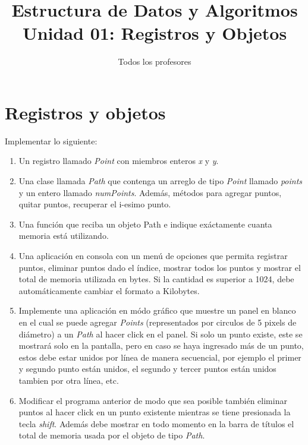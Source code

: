 \documentclass[a4paper]{article}
\title{Estructura de Datos y Algoritmos \\
  \large Unidad 01: Registros y Objetos}
\author{Todos los profesores}
\begin{document}
\maketitle

\section{Registros y objetos}
Implementar lo siguiente:
\begin{enumerate}
  \item Un registro llamado \emph{Point} con miembros enteros \emph{x} y
    \emph{y}.
  \item Una clase llamada \emph{Path} que contenga un arreglo de tipo
    \emph{Point} llamado \emph{points} y un entero llamado \emph{numPoints}.
    Además, métodos para agregar puntos, quitar puntos, recuperar el i-esimo
    punto.
  \item Una función que reciba un objeto Path e indique exáctamente cuanta
    memoria está utilizando.
  \item Una aplicación en consola con un menú de opciones que permita registrar
    puntos, eliminar puntos dado el índice, mostrar todos los puntos y mostrar
    el total de memoria utilizada en bytes. Si la cantidad es superior a 1024,
    debe automáticamente cambiar el formato a Kilobytes.
  \item Implemente una aplicación en módo gráfico que muestre un panel en blanco
    en el cual se puede agregar \emph{Points} (representados por circulos de 5
    pixels de diámetro) a un \emph{Path} al hacer click en el panel. Si solo un
    punto existe, este se mostrará solo en la pantalla, pero en caso se haya
    ingresado más de un punto, estos debe estar unidos por línea de manera
    secuencial, por ejemplo el primer y segundo punto están unidos, el segundo y
    tercer puntos están unidos tambien por otra línea, etc.
  \item Modificar el programa anterior de modo que sea posible también eliminar
    puntos al hacer click en un punto existente mientras se tiene presionada la
    tecla \emph{shift}. Además debe mostrar en todo momento en la barra de
    títulos el total de memoria usada por el objeto de tipo \emph{Path}.
\end{enumerate}
\end{document}
